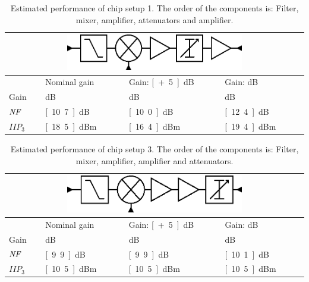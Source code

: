 		\begin{table}[hpt!]
			\caption[Estimated performance of chip setup 1.]{Estimated performance of chip setup 1. The order of the components is: Filter, mixer, amplifier, attenuators and amplifier.}
			\label{tab:confper1}
			\centering
			\begin{tabular}{ l l l l }
				\multicolumn{4}{c}{\includegraphics[width=0.6\textwidth]{fig/system/sys1}} \\\toprule
				& Nominal gain & Gain: \unit[+5]{dB} & Gain: \unit[-5]{dB} \\\midrule
				Gain & \unit[9]{dB} & \unit[14]{dB} & \unit[4]{dB} \\
				$\emph{NF}$ & \unit[10.7]{dB} & \unit[10.0]{dB} & \unit[12.4]{dB} \\
				$IIP_3$ & \unit[18.5]{dBm} & \unit[16.4]{dBm} & \unit[19.4]{dBm} \\\bottomrule
			\end{tabular}
		\end{table}

		\begin{table}[hpt!]
			\caption[Estimated performance of chip setup 3.]{Estimated performance of chip setup 3. The order of the components is: Filter, mixer, amplifier, amplifier and attenuators.}
			\label{tab:confper3}
			\centering
			\begin{tabular}{ l l l l }
				\multicolumn{4}{c}{\includegraphics[width=0.6\textwidth]{fig/system/sys3}} \\\toprule
				& Nominal gain & Gain: \unit[+5]{dB} & Gain: \unit[-5]{dB} \\\midrule
				Gain & \unit[9]{dB} & \unit[14]{dB} & \unit[4]{dB} \\
				$\emph{NF}$ & \unit[9.9]{dB} & \unit[9.9]{dB} & \unit[10.1]{dB} \\
				$IIP_3$ & \unit[10.5]{dBm} & \unit[10.5]{dBm} & \unit[10.5]{dBm} \\\bottomrule
			\end{tabular}
		\end{table}

